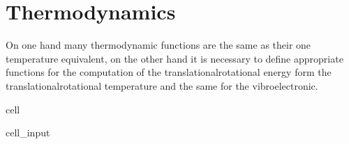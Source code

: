 \documentclass[letterpaper,10pt,english]{jupyterBook}
\begin{document}
\section{Thermodynamics}
\label{\detokenize{2_Temperature/_2T_Problem_class_definition:thermodynamics}}
\sphinxAtStartPar
On one hand many thermodynamic functions are the same as their one temperature equivalent, on the other hand it is necessary to define appropriate functions for the computation of the translational\sphinxhyphen{}rotational energy form the translational\sphinxhyphen{}rotational temperature and the same for the vibro\sphinxhyphen{}electronic.

\begin{sphinxuseclass}{cell}\begin{sphinxVerbatimInput}

\begin{sphinxuseclass}{cell_input}
\begin{sphinxVerbatim}[commandchars=\\\{\}]
 
     
          \PYG{p}{[}\PYG{p}{]}
              \PYG{p}{[}\PYG{p}{]}
              
            
              
          \PYG{p}{[}\PYG{p}{]}
                     
    
       
        
          
        

\end{sphinxVerbatim}
\end{sphinxuseclass}
\end{sphinxVerbatimInput}
\end{sphinxuseclass}
\end{document}
